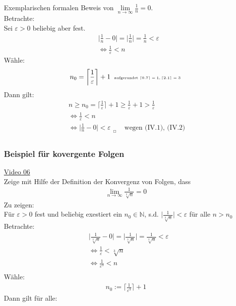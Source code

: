 Exemplarischen formalen Beweis von $ \lim\limits_ {n\to\infty}\frac{1}{n}=0 $.\\
Betrachte:\\
Sei $ \varepsilon>0 $ beliebig aber fest.
\begin{align}
&\bigg|\frac{1}{n}-0\bigg|=\bigg|\frac{1}{n}\bigg|=\frac{1}{n}<\varepsilon\\
&\Leftrightarrow \frac{1}{\varepsilon}<n
\end{align}
Wähle:\\
\begin{align*}
n_0=\bigg\lceil\frac{1}{\varepsilon}\bigg \rceil+1 \;\;\text{\tiny{aufgerundet $ \lceil0.7\rceil=1,\lceil2.1\rceil=3 $} }
\end{align*}
Dann gilt:\\
\begin{align*}
&n\geq n_0=\bigg\lceil\frac{1}{\varepsilon}\bigg\rceil+1\geq \frac{1}{\varepsilon}+1>\frac{1}{\varepsilon}\\
&\Leftrightarrow \frac{1}{\varepsilon} < n\\
&\Leftrightarrow\bigg|\frac{1}{n}-0\bigg|<\varepsilon_{\;\;_{\Square}} \;\;\;\;\text{wegen (IV.1), (IV.2)}\;\;\\
\end{align*}
\newpage
\noindent
\subsubsection{Beispiel für kovergente Folgen}
\href{https://youtu.be/qHlKFxy1ILw}{Video 06}\\
Zeige mit Hilfe der Definition der Konvergenz von Folgen, dass\\
\begin{align*}
\lim\limits_ {n\to\infty}\frac{1}{\sqrt[3]{n}}=0
\end{align*}
Zu zeigen:\\
Für $ \varepsilon>0 $ fest und beliebig exestiert ein $ n_0\in \mathbb{N}$, s.d. $\big |\frac{1}{\sqrt[3]{n}}\big|<\varepsilon $ für alle $ n>n_0 $\\
Betrachte:\\
\begin{align*}
&\bigg|\frac{1}{\sqrt[3]{n}}-0 \bigg |=\bigg |\frac{1}{\sqrt[3]{n}}\bigg |=\frac{1}{\sqrt[3]{n}}<\varepsilon\\
&\Leftrightarrow\frac{1}{\varepsilon}<\sqrt[3]{n}\\
&\Leftrightarrow \frac{1}{\varepsilon^3}<n\\
\end{align*}
Wähle:\\
\begin{align*}
n_0:=\bigg\lceil\frac{1}{\varepsilon^3}\bigg\rceil+1
\end{align*}
Dann gilt für alle:\\

